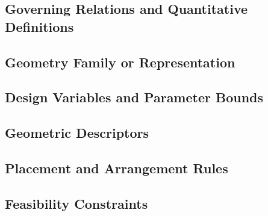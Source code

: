 %

\subsection{Governing Relations and Quantitative Definitions}
\label{sec:res-geo-cst-governing-relations}

%

\subsection{Geometry Family or Representation}
\label{sec:res-geo-cst-geometry-family-representation}


\subsection{Design Variables and Parameter Bounds}
\label{sec:res-geo-cst-design-variables-parameter-bounds}


\subsection{Geometric Descriptors}
\label{sec:res-geo-cst-geometric-descriptors}


\subsection{Placement and Arrangement Rules}
\label{sec:res-geo-cst-placement-arrangement-rules}


\subsection{Feasibility Constraints}
\label{sec:res-geo-cst-feasibility-constraints}

